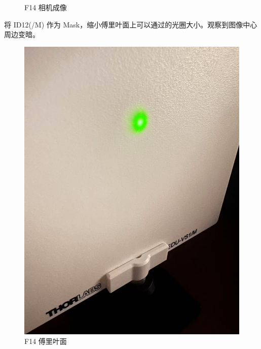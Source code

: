 \documentclass{ctexart}
\begin{document}
\begin{figure}[H]
\begin{minipage}[b]{0.3\textwidth}
    \caption{F14 相机成像}
  \end{minipage}
\end{figure}

将 ID12(/M) 作为 Mask，缩小傅里叶面上可以通过的光圈大小。观察到图像中心周边变暗。
\begin{figure}[H]
  \centering
  \begin{minipage}[b]{0.2\textwidth}
    \centering
    \includegraphics[width=\textwidth]{pictures/微信图片_20241017164905.jpg}
    \caption{F14 傅里叶面}
  \end{minipage}
  \hspace{0.1\textwidth} %
  \begin{minipage}[b]{0.3\textwidth}
    \centering

\end{minipage}
\end{figure}
\end{document}
